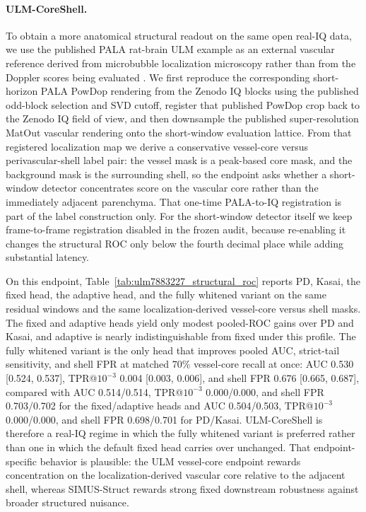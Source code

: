 \documentclass[11pt]{article}
\begin{document}
\paragraph{ULM-CoreShell.}
To obtain a more anatomical structural readout on the same open real-IQ data, we use the published PALA rat-brain ULM example as an external vascular reference derived from microbubble localization microscopy rather than from the Doppler scores being evaluated \cite{ChavignonZenodo7883227,HeilesULMBenchmark2021}. We first reproduce the corresponding short-horizon PALA PowDop rendering from the Zenodo IQ blocks using the published odd-block selection and SVD cutoff, register that published PowDop crop back to the Zenodo IQ field of view, and then downsample the published super-resolution MatOut vascular rendering onto the short-window evaluation lattice. From that registered localization map we derive a conservative vessel-core versus perivascular-shell label pair: the vessel mask is a peak-based core mask, and the background mask is the surrounding shell, so the endpoint asks whether a short-window detector concentrates score on the vascular core rather than the immediately adjacent parenchyma. That one-time PALA-to-IQ registration is part of the label construction only. For the short-window detector itself we keep frame-to-frame registration disabled in the frozen audit, because re-enabling it changes the structural ROC only below the fourth decimal place while adding substantial latency.

On this endpoint, Table~\ref{tab:ulm7883227_structural_roc} reports PD, Kasai, the fixed head, the adaptive head, and the fully whitened variant on the same residual windows and the same localization-derived vessel-core versus shell masks. The fixed and adaptive heads yield only modest pooled-ROC gains over PD and Kasai, and adaptive is nearly indistinguishable from fixed under this profile. The fully whitened variant is the only head that improves pooled AUC, strict-tail sensitivity, and shell FPR at matched 70\% vessel-core recall at once: AUC 0.530 [0.524, 0.537], TPR@$10^{-3}$ 0.004 [0.003, 0.006], and shell FPR 0.676 [0.665, 0.687], compared with AUC 0.514/0.514, TPR@$10^{-3}$ 0.000/0.000, and shell FPR 0.703/0.702 for the fixed/adaptive heads and AUC 0.504/0.503, TPR@$10^{-3}$ 0.000/0.000, and shell FPR 0.698/0.701 for PD/Kasai. ULM-CoreShell is therefore a real-IQ regime in which the fully whitened variant is preferred rather than one in which the default fixed head carries over unchanged. That endpoint-specific behavior is plausible: the ULM vessel-core endpoint rewards concentration on the localization-derived vascular core relative to the adjacent shell, whereas SIMUS-Struct rewards strong fixed downstream robustness against broader structured nuisance.
\end{document}
